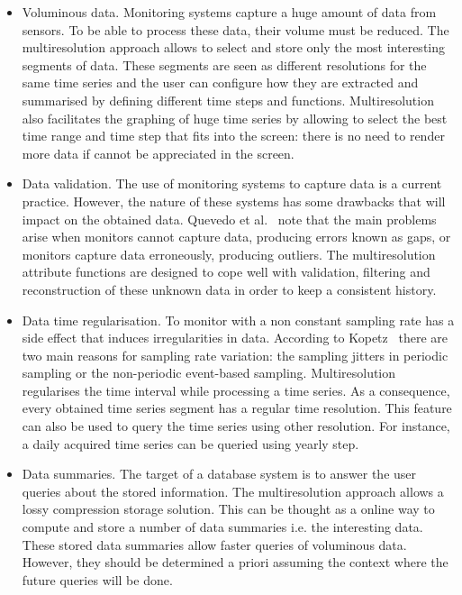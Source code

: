 \begin{itemize}
\item Voluminous data. Monitoring systems capture a huge amount of
  data from sensors. To be able to process these data, their volume must
  be reduced. The multiresolution approach allows to select and store
  only the most interesting segments of data. These segments are seen
  as different resolutions for the same time series and the user can
  configure how they are extracted and summarised by defining
  different time steps and functions. Multiresolution also facilitates
  the graphing of huge time series by allowing to select the best time
  range and time step that fits into the screen: there is no need to
  render more data if cannot be appreciated in the screen.

\item Data validation. The use of monitoring systems to capture data
  is a current practice. However, the nature of these systems has some
  drawbacks that will impact on the obtained data. Quevedo et
  al.~\cite{quevedo10} note that the main problems arise when monitors
  cannot capture data, producing errors known as gaps, or monitors
  capture data erroneously, producing outliers.  The multiresolution
  attribute functions are designed to cope well with validation,
  filtering and reconstruction of these unknown data in order to keep
  a consistent history.

\item Data time regularisation. To monitor with a non constant
  sampling rate has a side effect that induces irregularities in data.
  According to Kopetz~\cite{kopetz11:realtime} there are two main
  reasons for sampling rate variation: the sampling jitters in
  periodic sampling or the non-periodic event-based sampling.
  Multiresolution regularises the time interval while processing a
  time series. As a consequence, every obtained time series segment
  has a regular time resolution. This feature can also be used to
  query the time series using other resolution. For instance, a daily
  acquired time series can be queried using yearly step.

\item Data summaries. The target of a database system is to answer the
  user queries about the stored information. The multiresolution
  approach allows a lossy compression storage solution. This can be
  thought as a online way to compute and store a number of data
  summaries i.e. the interesting data. These stored data summaries
  allow faster queries of voluminous data. However, they should be
  determined a priori assuming the context where the future queries
  will be done.
\end{itemize}







